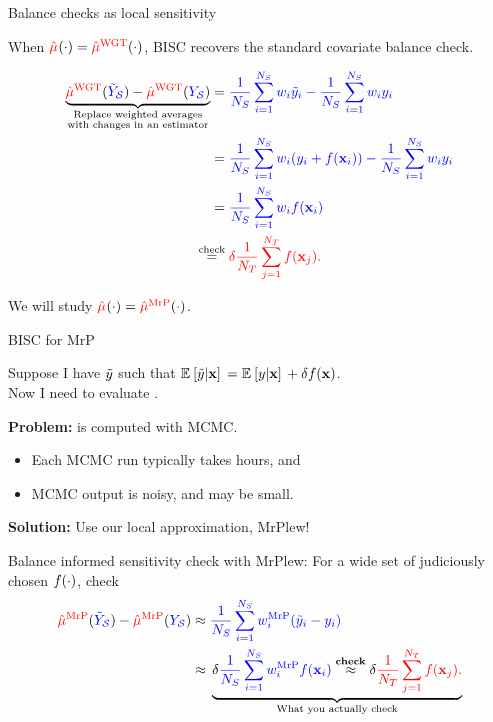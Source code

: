
\begin{frame}[t]{Balance checks as local sensitivity}


When $\tarcol{\muhat}(\cdot) = \muhatcw[\cdot]$,
BISC recovers the standard covariate balance check.

$$
\begin{aligned}
    \underbrace{
        \muhatcw[\Ytil] - \muhatcw
    }_{
        \substack{
            \text{Replace weighted averages} \\
            \text{with changes in an estimator}
        }
    }
    ={}&
    \surcol{\meansur \w_i \ytil_i - \meansur \w_i \y_i}
    \\={}&
    \surcol{\meansur \w_i (\y_i + \f(\x_i)) - \meansur \w_i \y_i}
    \\={}&
    \surcol{\meansur \w_i \f(\x_i)}
    \\\eqcheck{}&
    \tarcol{
    \delta \meantar f(\x_j).}
\end{aligned}
$$


We will study $\tarcol{\muhat}(\cdot) = \muhatmrp[\cdot]$.

\end{frame}



\begin{frame}[t]{BISC for MrP}

Suppose I have
$\ytil$ such that $\expect{}{\ytil \vert \x} = \expect{}{\y \vert \x} + \delta f(\x)$.\\
Now I need to evaluate \surcol{$\muhatmrp[\Ytil] - \muhatmrp$}.
\pause

\textbf{Problem:} \surcol{$\muhatmrp[\cdot]$} is computed with MCMC.
%
\begin{itemize}
\item Each MCMC run typically takes hours, and
\item MCMC output is noisy, and \surcol{$\muhatmrp[\Ytil] - \muhatmrp$} may be small.
\end{itemize}
%
\pause
\textbf{Solution:} Use our local approximation, MrPlew!

\begin{block}{Balance informed sensitivity check with MrPlew:}
For a wide set of judiciously chosen $\f(\cdot)$, check
$$
\begin{aligned}
\muhatmrp[\Ytil] - \muhatmrp \approx{}&
    \surcol{\meansur \w_i^\mrp (\ytil_i - \y_i)}
    \\\approx{}&
    \underbrace{
        \delta  \surcol{\meansur \w_i^\mrp \f(\x_i)}
            \overset{\textrm{\textbf{check}}}{\approx}
        \delta \tarcol{\meantar f(\x_j).}
    }_{\textrm{What you actually check}}
\end{aligned}
$$
\end{block}

\end{frame}

